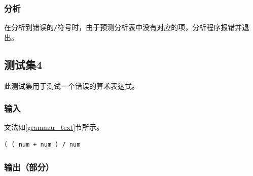 \documentclass[lang=cn,11pt,a4paper,cite=authornum]{paper}
\begin{document}
\subsubsection{分析}

在分析到错误的\texttt{/}符号时，由于预测分析表中没有对应的项，分析程序报错并退出。

\subsection{测试集4}

此测试集用于测试一个错误的算术表达式。

\subsubsection{输入}

文法如\ref{grammar_text}节所示。

\begin{code}
\begin{verbatim}
( ( num + num ) / num
\end{verbatim}
\end{code}

\subsubsection{输出（部分）}
\end{document}
